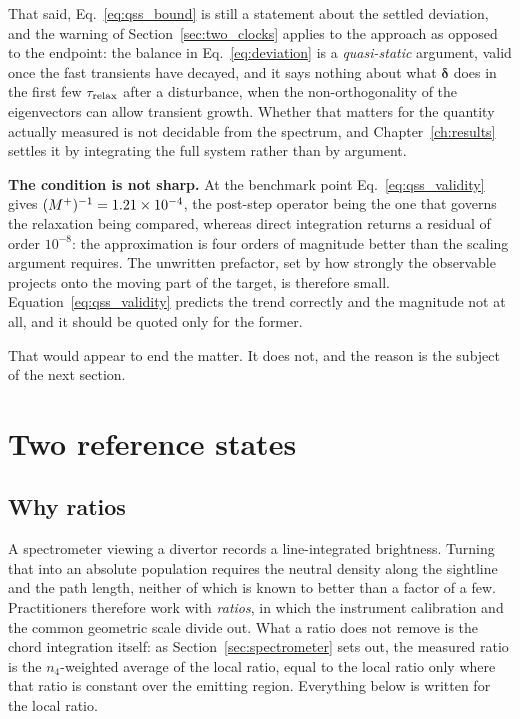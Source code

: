 That said, Eq.~\eqref{eq:qss_bound} is still a statement about the settled
deviation, and the warning of Section~\ref{sec:two_clocks} applies to the
approach as opposed to the endpoint: the balance in Eq.~\eqref{eq:deviation}
is a \emph{quasi-static} argument, valid once the fast transients have decayed,
and it says nothing about what $\bm{\delta}$ does in the first few $\tau_{\mathrm{relax}}$
after a disturbance, when the non-orthogonality of the eigenvectors can allow
transient growth. Whether that matters for the quantity actually measured is
not decidable from the spectrum, and Chapter~\ref{ch:results} settles it by
integrating the full system rather than by argument.

\textbf{The condition is not sharp.} At the benchmark point
Eq.~\eqref{eq:qss_validity} gives $(M^{+})^{-1} = 1.21\times10^{-4}$, the
post-step operator being the one that governs the relaxation being compared,
whereas direct integration returns a residual of order $10^{-8}$: the
approximation is four orders of magnitude better than the scaling argument
requires. The unwritten prefactor, set by how strongly the observable projects
onto the moving part of the target, is therefore small. Equation~\eqref{eq:qss_validity} predicts the
trend correctly and the magnitude not at all, and it should be quoted only for
the former.

That would appear to end the matter. It does not, and the reason is the subject
of the next section.

\section{Two reference states}
\label{sec:two_references}

\subsection{Why ratios}

A spectrometer viewing a divertor records a line-integrated brightness. Turning
that into an absolute population requires the neutral density along the
sightline and the path length, neither of which is known to better than a factor
of a few. Practitioners therefore work with \emph{ratios}, in which the
instrument calibration and the common geometric scale divide out. What a ratio
does not remove is the chord integration itself: as
Section~\ref{sec:spectrometer} sets out, the measured ratio is the $n_4$-weighted
average of the local ratio, equal to the local ratio only where that ratio is
constant over the emitting region. Everything below is written for the local
ratio.

